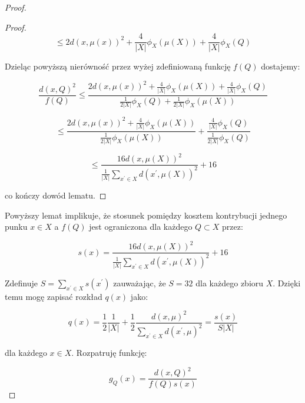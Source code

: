 \begin{proof}
\begin{proof}
    \begin{equation}
       \leq 2d(x, \mu(x))^2 +  \frac{4}{|X|} \phi_{X}(\mu(X))+ \frac{4}{|X|} \phi_{X}(Q)
    \end{equation}

    \noindent
    Dzieląc powyższą nierówność przez wyżej zdefiniowaną funkcję $f(Q)$ dostajemy:

    \begin{equation}
        \frac{d(x, Q)^2}{f(Q)} \leq \frac{2d(x, \mu(x))^2 +  \frac{4}{|X|} \phi_{X}(\mu(X))+ \frac{4}{|X|} \phi_{X}(Q)}{\frac{1}{2|X|}\phi_{X}(Q) + \frac{1}{2|X|}\phi_{X}(\mu(X))}
    \end{equation}

    \begin{equation}
        \leq \frac{2d(x, \mu(x))^2 +  \frac{4}{|X|} \phi_{X}(\mu(X))}{\frac{1}{2|X|}\phi_{X}(\mu(X))} + \frac{\frac{4}{|X|} \phi_{X}(Q)}{\frac{1}{2|X|}\phi_{X}(Q)}
    \end{equation}

    \begin{equation}
        \leq \frac{16d(x, \mu(X))^2}{\frac{1}{|X|}\sum_{x^{'} \in X}d(x^{'}, \mu(X))^2} + 16
    \end{equation}

    \noindent
    co kończy dowód lematu.
\end{proof}

\noindent
Powyższy lemat implikuje, że stosunek pomiędzy kosztem kontrybucji jednego punku $x \in X$ a $f(Q)$ jest ograniczona dla każdego $Q \subset X$ przez:

\begin{equation}
    s(x) = \frac{16d(x, \mu(X))^2}{\frac{1}{|X|}\sum_{x^{'} \in X}d(x^{'}, \mu(X))^2} + 16    
\end{equation}

\noindent
Zdefinuje $S = \sum_{x^{'} \in X}s(x^{'})$ zauważając, że $S = 32$ dla każdego zbioru $X$.
Dzięki temu mogę zapisać rozkład $q(x)$ jako:

\begin{equation}
    q(x) = \frac{1}{2}\frac{1}{|X|} + \frac{1}{2}\frac{d(x, \mu)^2}{\sum_{x^{'} \in X}d(x^{'}, \mu)^2} = \frac{s(x)}{S|X|}
\end{equation}

\noindent
dla każdego $x \in X$. Rozpatruję funkcję:

\begin{equation}
    g_{Q}(x) = \frac{d(x, Q)^2}{f(Q)s(x)}
\end{equation}


\end{proof}
